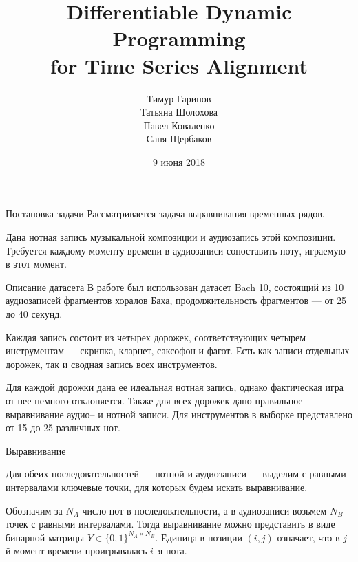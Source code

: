 \documentclass[unicode, dvipsnames]{beamer}
\title[Time Series Alignment]{Differentiable Dynamic Programming \\ for Time Series Alignment}
\author[Гарипов и прочие]{Тимур Гарипов \\ Татьяна Шолохова \\ Павел Коваленко \\ Саня Щербаков}
\date{9 июня 2018}
\begin{document}
\begin{frame}
    \titlepage
\end{frame}

\begin{frame}{Постановка задачи}
	Рассматривается задача выравнивания временных рядов.
	
	\bigskip
	Дана нотная запись музыкальной композиции и аудиозапись этой композиции. Требуется каждому моменту времени в аудиозаписи сопоставить ноту, играемую в этот момент.

\end{frame}

\begin{frame}{Описание датасета}
В работе был использован датасет \href{http://music.cs.northwestern.edu/data/Bach10.html}{Bach 10}, состоящий из 10 аудиозаписей фрагментов хоралов Баха, продолжительность фрагментов --- от 25 до 40 секунд. 

\bigskip
Каждая запись состоит из четырех дорожек, соответствующих четырем инструментам --- скрипка, кларнет, саксофон и фагот. Есть как записи отдельных дорожек, так и сводная запись всех инструментов.

\bigskip
Для каждой дорожки дана ее идеальная нотная запись, однако фактическая игра от нее немного отклоняется. Также для всех дорожек дано правильное выравнивание аудио-- и нотной записи. Для инструментов в выборке представлено от 15 до 25 различных нот.

\end{frame}

\begin{frame}{Выравнивание}

Для обеих последовательностей --- нотной и аудиозаписи --- выделим с равными интервалами ключевые точки, для которых будем искать выравнивание.

\bigskip
Обозначим за $N_A$ число нот в последовательности, а в аудиозаписи возьмем $N_B$ точек с равными интервалами. Тогда выравнивание можно представить в виде бинарной матрицы $Y \in \{0, 1\}^{N_A \times N_B}$. Единица в позиции $(i, j)$ означает, что в $j$--й момент времени проигрывалась $i$--я нота.

\end{frame}
\end{document}
